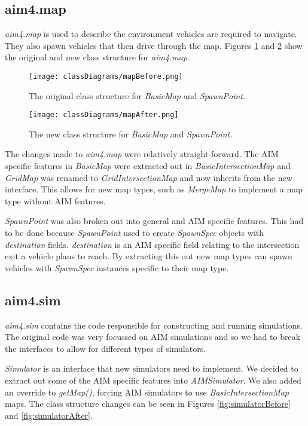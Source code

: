 \begin{appendices}
\FloatBarrier
\subsection{aim4.map}
\label{subsec:aim4.map}
\emph{aim4.map} is used to describe the environment vehicles are required to navigate. They also spawn vehicles that then drive through the map. Figures \ref{fig:mapBefore} and \ref{fig:mapAfter} show the original and new class structure for \emph{aim4.map}.

\begin{figure}[htb]
\centering
\texttt{[image: classDiagrams/mapBefore.png]}
\caption{The original class structure for \emph{BasicMap} and \emph{SpawnPoint}.}
\label{fig:mapBefore}
\end{figure}

\begin{figure}[htb]
\centering
\texttt{[image: classDiagrams/mapAfter.png]}
\caption{The new class structure for \emph{BasicMap} and \emph{SpawnPoint}.}
\label{fig:mapAfter}
\end{figure}

The changes made to \emph{aim4.map} were relatively straight-forward. The AIM specific features in \emph{BasicMap} were extracted out in \emph{BasicIntersectionMap} and \emph{GridMap} was renamed to \emph{GridIntersectionMap} and now inherits from the new interface. This allows for new map types, such as \emph{MergeMap} to implement a map type without AIM features.

\emph{SpawnPoint} was also broken out into general and AIM specific features. This had to be done because \emph{SpawnPoint} used to create \emph{SpawnSpec} objects with \emph{destination} fields. \emph{destination} is an AIM specific field relating to the intersection exit a vehicle plans to reach. By extracting this out new map types can spawn vehicles with \emph{SpawnSpec} instances specific to their map type.

\FloatBarrier
\subsection{aim4.sim}
\label{subsec:aim4.sim}
\emph{aim4.sim} contains the code responsible for constructing and running simulations. The original code was very focussed on AIM simulations and so we had to break the interfaces to allow for different types of simulators. 

\emph{Simulator} is an interface that new simulators need to implement. We decided to extract out some of the AIM specific features into \emph{AIMSimulator}. We also added an override to \emph{getMap()}, forcing AIM simulators to use \emph{BasicIntersectionMap} maps. The class structure changes can be seen in Figures \ref{fig:simulatorBefore} and \ref{fig:simulatorAfter}.


\end{appendices}
